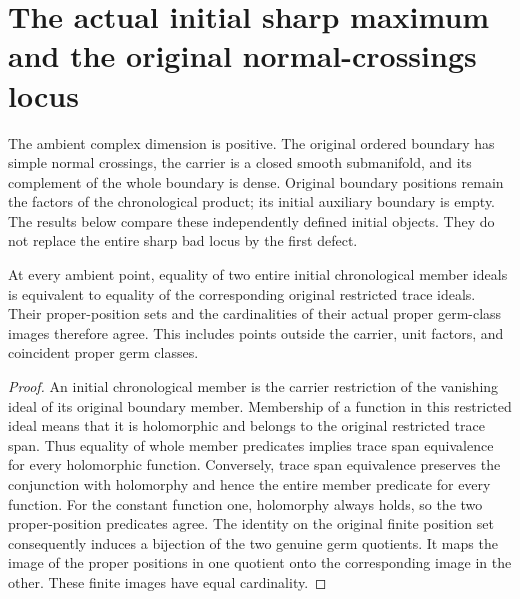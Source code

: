 \section{The actual initial sharp maximum and the original normal-crossings locus}

The ambient complex dimension is positive. The original ordered boundary has
simple normal crossings, the carrier is a closed smooth submanifold, and its
complement of the whole boundary is dense. Original boundary positions remain
the factors of the chronological product; its initial auxiliary boundary is
empty. The results below compare these independently defined initial objects.
They do not replace the entire sharp bad locus by the first defect.

\begin{lemma}
\label{hir:sharp-actual-initial-germ-quotient-source}
At every ambient point, equality of two entire initial chronological member
ideals is equivalent to equality of the corresponding original restricted
trace ideals. Their proper-position sets and the cardinalities of their
actual proper germ-class images therefore agree. This includes points outside
the carrier, unit factors, and coincident proper germ classes.
\end{lemma}
\begin{proof}
An initial chronological member is the carrier restriction of the vanishing
ideal of its original boundary member. Membership of a function in this
restricted ideal means that it is holomorphic and belongs to the original
restricted trace span. Thus equality of whole member predicates implies trace
span equivalence for every holomorphic function. Conversely, trace span
equivalence preserves the conjunction with holomorphy and hence the entire
member predicate for every function. For the constant function one,
holomorphy always holds, so the two proper-position predicates agree.
The identity on the original finite position set consequently induces a
bijection of the two genuine germ quotients. It maps the image of the proper
positions in one quotient onto the corresponding image in the other. These
finite images have equal cardinality.
\leanok
\end{proof}

